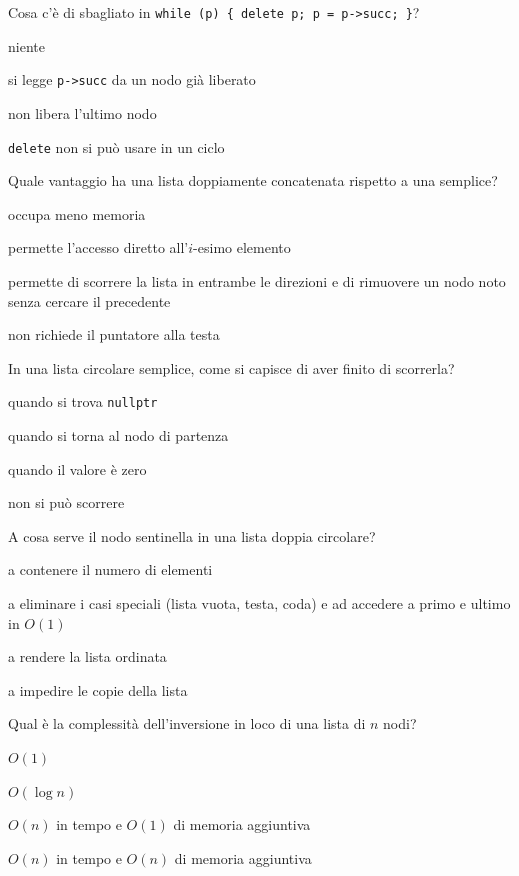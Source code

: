 \begin{quiz}{Cosa c'è di sbagliato in \texttt{while (p) \{ delete p; p = p->succ; \}}?}
  \item niente
  \item si legge \texttt{p->succ} da un nodo già liberato
  \item non libera l'ultimo nodo
  \item \texttt{delete} non si può usare in un ciclo
\end{quiz}

\begin{quiz}{Quale vantaggio ha una lista doppiamente concatenata rispetto a una semplice?}
  \item occupa meno memoria
  \item permette l'accesso diretto all'$i$-esimo elemento
  \item permette di scorrere la lista in entrambe le direzioni e di rimuovere un nodo noto senza cercare il precedente
  \item non richiede il puntatore alla testa
\end{quiz}

\begin{quiz}{In una lista circolare semplice, come si capisce di aver finito di scorrerla?}
  \item quando si trova \texttt{nullptr}
  \item quando si torna al nodo di partenza
  \item quando il valore è zero
  \item non si può scorrere
\end{quiz}

\begin{quiz}{A cosa serve il nodo sentinella in una lista doppia circolare?}
  \item a contenere il numero di elementi
  \item a eliminare i casi speciali (lista vuota, testa, coda) e ad accedere a primo e ultimo in $O(1)$
  \item a rendere la lista ordinata
  \item a impedire le copie della lista
\end{quiz}

\begin{quiz}{Qual è la complessità dell'inversione in loco di una lista di $n$ nodi?}
  \item $O(1)$
  \item $O(\log n)$
  \item $O(n)$ in tempo e $O(1)$ di memoria aggiuntiva
  \item $O(n)$ in tempo e $O(n)$ di memoria aggiuntiva
\end{quiz}

